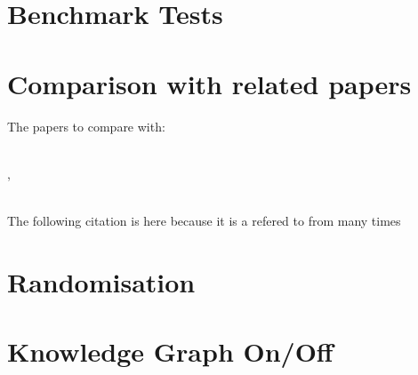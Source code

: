 \newpage
\section{Benchmark Tests}
\section{Comparison with related papers}
The papers to compare with:\newline

\\

\cite{sabbaghnovin_model_2021}, 


\\
\cite{novin_dynamic_2018}
The following \cite{novin_dynamic_2018} citation is here because it is a refered to from \cite{sabbaghnovin_model_2021} many times
\section{Randomisation}
\section{Knowledge Graph On/Off}
